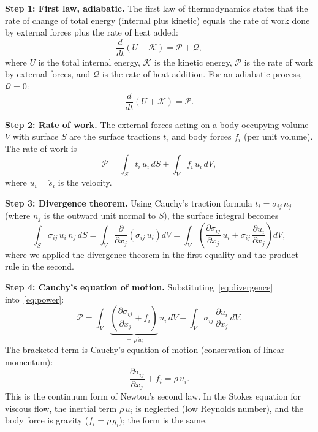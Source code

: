 \documentclass[11pt]{article}
\begin{document}
\medskip
\noindent\textbf{Step 1: First law, adiabatic.}  The first law of thermodynamics states that the rate of change of total energy (internal plus kinetic) equals the rate of work done by external forces plus the rate of heat added:
\begin{equation}
  \frac{d}{dt}(U + \mathcal{K}) = \mathcal{P} + \mathcal{Q},
  \label{eq:first_law_total}
\end{equation}
where $U$ is the total internal energy, $\mathcal{K}$ is the kinetic energy, $\mathcal{P}$ is the rate of work by external forces, and $\mathcal{Q}$ is the rate of heat addition.  For an adiabatic process, $\mathcal{Q} = 0$:
\begin{equation}
  \frac{d}{dt}(U + \mathcal{K}) = \mathcal{P}.
  \label{eq:first_law_adiabatic}
\end{equation}

\noindent\textbf{Step 2: Rate of work.}  The external forces acting on a body occupying volume $V$ with surface $S$ are the surface tractions $t_i$ and body forces $f_i$ (per unit volume).  The rate of work is
\begin{equation}
  \mathcal{P} = \int_S t_i\,u_i\,dS + \int_V f_i\,u_i\,dV,
  \label{eq:power}
\end{equation}
where $u_i = \dot{s}_i$ is the velocity.

\medskip
\noindent\textbf{Step 3: Divergence theorem.}  Using Cauchy's traction formula $t_i = \sigma_{ij}\,n_j$ (where $n_j$ is the outward unit normal to $S$), the surface integral becomes
\begin{equation}
  \int_S \sigma_{ij}\,u_i\,n_j\,dS = \int_V \frac{\partial}{\partial x_j}\!\left(\sigma_{ij}\,u_i\right)dV = \int_V \left(\frac{\partial \sigma_{ij}}{\partial x_j}\,u_i + \sigma_{ij}\,\frac{\partial u_i}{\partial x_j}\right)dV,
  \label{eq:divergence}
\end{equation}
where we applied the divergence theorem in the first equality and the product rule in the second.

\medskip
\noindent\textbf{Step 4: Cauchy's equation of motion.}  Substituting~\eqref{eq:divergence} into~\eqref{eq:power}:
\begin{equation}
  \mathcal{P} = \int_V \underbrace{\left(\frac{\partial \sigma_{ij}}{\partial x_j} + f_i\right)}_{\displaystyle = \,\rho\,\dot{u}_i}\,u_i\,dV + \int_V \sigma_{ij}\,\frac{\partial u_i}{\partial x_j}\,dV.
  \label{eq:power_expanded}
\end{equation}
The bracketed term is Cauchy's equation of motion (conservation of linear momentum):
\begin{equation}
  \frac{\partial \sigma_{ij}}{\partial x_j} + f_i = \rho\,\dot{u}_i.
  \label{eq:cauchy_motion}
\end{equation}
This is the continuum form of Newton's second law.  In the Stokes equation for viscous flow, the inertial term $\rho\,\dot{u}_i$ is neglected (low Reynolds number), and the body force is gravity ($f_i = \rho\,g_i$); the form is the same.
\end{document}
